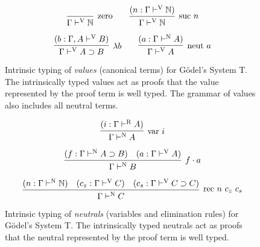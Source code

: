 \documentclass[preprint,nonatbib]{sigplanconf}
\numberwithin{subdefin}{defin}
\theoremstyle{definition}
\numberwithin{subtheorem}{theorem}
\numberwithin{sublemma}{theorem}
\numberwithin{corollary}{theorem}
\numberwithin{case}{theorem}
\numberwithin{slcase}{sublemma}
\numberwithin{scase}{subtheorem}
\numberwithin{lcase}{lemma}
\def\arr{\supset}
\def\app{\cdot}
\def\lam{\lambda}
\def\nat{\mathbb{N}}
\newcommand{\turn}[1]{\vdash^\con{#1}}
\newcommand{\con}[1]{\textmd{#1}}
\newcommand{\fun}[1]{\textmd{#1}}
\newcommand{\typv}[1]{\Gamma \turn{V} #1}
\newcommand{\ctypv}[2]{\Gamma , #1 \turn{V} #2}
\newcommand{\typn}[1]{\Gamma \turn{N} #1}
\newcommand{\typr}[1]{\Gamma \turn{R} #1}
\begin{document}
\begin{figure}
\caption{
Intrinsic typing of {\it values} (canonical terms) for G{\"o}del's System T.
The intrinsically typed values act as proofs that the value
represented by the proof term is well typed. The grammar of values
also includes all neutral terms.
}
$$
\infer
  [\con{zero}]
  {\typv{\nat}}
{}
\qquad
\infer
  [\con{suc} ~ n]
  {\typv{\nat}}
{
  (n : \typv{\nat})
}
$$

$$
\infer
  [\lam b]
  {\typv{A \arr B}}
{
  (b : \ctypv{A}{B})
}
\qquad
\infer
  [\fun{neut} ~ a]
  {\typv{A}}
{
  (a : \typn{A})
}
$$
\label{fig:typv}
\end{figure}

\begin{figure}
\caption{
Intrinsic typing of {\it neutrals} (variables and elimination rules) 
for G{\"o}del's System T.
The intrinsically typed neutrals act as proofs that the neutral
represented by the proof term is well typed.
}

$$
\infer
  [\fun{var} ~ i]
  {\typn{A}}
{
  (i : \typr{A})
}
$$

$$
\infer
  [f \app a]
  {\typn{B}}
{
  (f : \typn{A \arr B})
  &
  (a : \typv{A})
}
$$

$$
\infer
  [\fun{rec} ~ n ~ c_z ~ c_s]
  {\typn{C}}
{
  (n : \typn{\nat})
  &
  (c_z : \typv{C})
  &
  (c_s : \typv{C \arr C})
}
$$
\label{fig:typn}
\end{figure}
\end{document}
